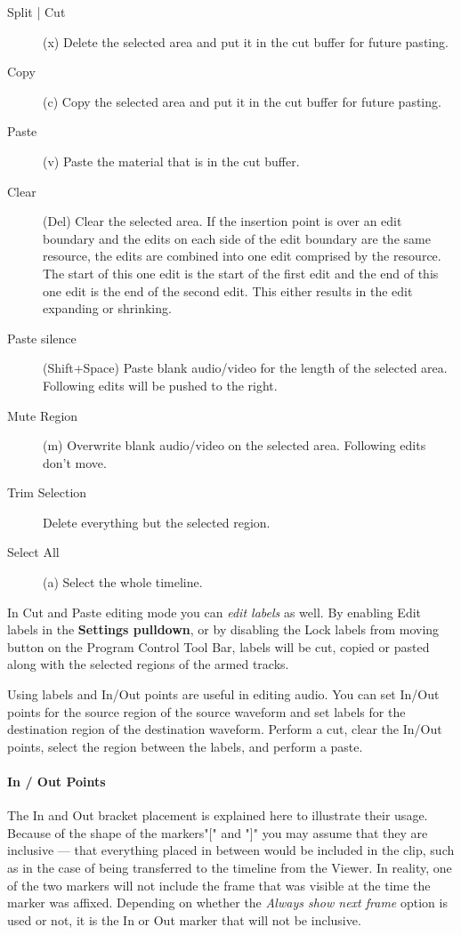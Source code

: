 \begin{description}
    \item [Split | Cut] (x) Delete the selected area and put it in the cut buffer for future pasting.
    \item[Copy] (c) Copy the selected area and put it in the cut buffer for future pasting.
    \item[Paste] (v)  Paste the material that is in the cut buffer.
    \item[Clear] (Del)  Clear the selected area. If the insertion point is over an edit boundary and the edits on
    each side of the edit boundary are the same resource, the edits are combined into one edit comprised
    by the resource. The start of this one edit is the start of the first edit and the end of this one edit is the
    end of the second edit. This either results in the edit expanding or shrinking.
    \item[Paste silence] (Shift+Space)  Paste blank audio/video for the length of the selected area. Following
    edits will be pushed to the right.
    \item[Mute Region] (m)  Overwrite blank audio/video on the selected area. Following edits don't move.
    \item[Trim Selection] Delete everything but the selected region.
    \item[Select All] (a) Select the whole timeline.
\end{description}

In Cut and Paste editing mode you can \textit{edit labels} as well. By enabling Edit labels in the \textbf{Settings pulldown}, or by disabling the Lock labels from moving button on the Program Control Tool Bar, labels will be cut, copied or pasted along with the selected regions of the armed tracks.

Using labels and In/Out points are useful in editing audio.  You can set In/Out points for the source region of the source waveform and set labels for the destination region of the destination waveform. Perform a cut, clear the In/Out points, select the region between the labels, and perform a paste.

\paragraph{In / Out Points} The In and Out bracket placement is explained here to illustrate their usage.  Because of the shape of the markers"[" and "]" you may assume that they are inclusive --- that everything placed in between would be included in the clip, such as in the case of being transferred to the timeline from the Viewer.  In reality, one of the two markers will not include the frame that was visible at the time the marker was affixed. Depending on whether the \textit{Always show next frame} option is used or not, it is the In or Out marker that will not be inclusive. 

